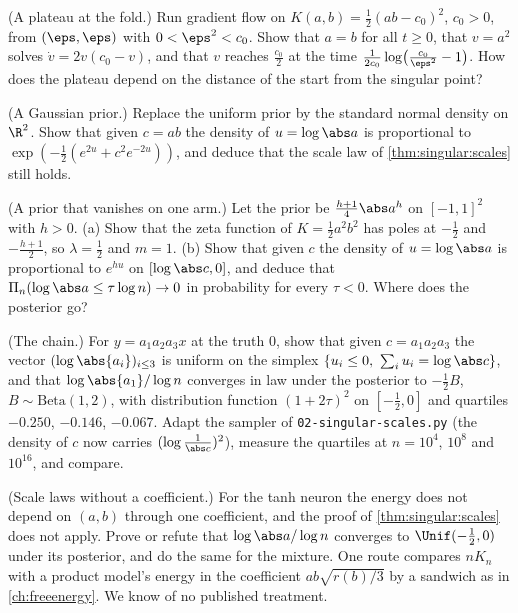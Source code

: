 \begin{refsection}
\begin{exercises}
\item \byhand (A plateau at the fold.) Run gradient flow on $K(a,b)=\frac12(ab-c_0)^2$, $c_0>0$, from $(\eps,\eps)$ with $0<\eps^2<c_0$. Show that $a=b$ for all $t\ge0$, that $v=a^2$ solves $\dot v=2v(c_0-v)$, and that $v$ reaches $\frac{c_0}2$ at the time $\frac1{2c_0}\log\bigl(\frac{c_0}{\eps^2}-1\bigr)$. How does the plateau depend on the distance of the start from the singular point?\label{ex:singular:plateau}

\item \variation\hard (A Gaussian prior.) Replace the uniform prior by the standard normal density on $\R^2$. Show that given $c=ab$ the density of $u=\log\abs a$ is proportional to $\exp(-\frac12(e^{2u}+c^2e^{-2u}))$, and deduce that the scale law of \cref{thm:singular:scales} still holds. \label{ex:singular:gaussprior}

\item \variation (A prior that vanishes on one arm.) Let the prior be $\frac{h+1}4\abs a^h$ on $[-1,1]^2$ with $h>0$. (a) Show that the zeta function of $K=\frac12a^2b^2$ has poles at $-\frac12$ and $-\frac{h+1}2$, so $\lambda=\frac12$ and $m=1$. (b) Show that given $c$ the density of $u=\log\abs a$ is proportional to $e^{hu}$ on $[\log\abs c,0]$, and deduce that $\Pi_n(\log\abs a\le\tau\log n)\to0$ in probability for every $\tau<0$. Where does the posterior go?\label{ex:singular:onearm}

\item \measurement (The chain.) For $y=a_1a_2a_3x$ at the truth $0$, show that given $c=a_1a_2a_3$ the vector $(\log\abs{a_i})_{i\le3}$ is uniform on the simplex $\{u_i\le0,\ \sum_iu_i=\log\abs c\}$, and that $\log\abs{a_1}/\log n$ converges in law under the posterior to $-\frac12B$, $B\sim\mathrm{Beta}(1,2)$, with distribution function $(1+2\tau)^2$ on $[-\frac12,0]$ and quartiles $-0.250$, $-0.146$, $-0.067$. Adapt the sampler of \texttt{02-singular-scales.py} (the density of $c$ now carries $(\log\frac1{\abs c})^2$), measure the quartiles at $n=10^4$, $10^8$ and $10^{16}$, and compare.\label{ex:singular:chain}

\item \research (Scale laws without a coefficient.) For the tanh neuron the energy does not depend on $(a,b)$ through one coefficient, and the proof of \cref{thm:singular:scales} does not apply. Prove or refute that $\log\abs a/\log n$ converges to $\Unif(-\frac12,0)$ under its posterior, and do the same for the mixture. One route compares $nK_n$ with a product model's energy in the coefficient $ab\sqrt{r(b)/3}$ by a sandwich as in \cref{ch:freeenergy}. We know of no published treatment.\label{ex:singular:tanhscales}
\end{exercises}


\end{refsection}
